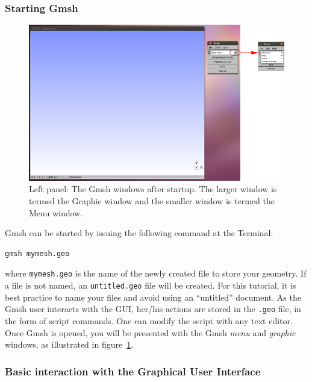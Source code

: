 \subsubsection{Starting Gmsh}
\begin{figure}[htbp]
 \centering
  \includegraphics[width=1.0\textwidth]{../figures/gmsh_startup_and_modules.png}
  \caption{Left panel: The Gmsh windows after startup. The larger window is termed the Graphic window
           and the smaller window is termed the Menu window.}
  \label{fig:gmsh_startup_and_modules}
\end{figure}
Gmsh can be started by issuing the following command at the Terminal:
\begin{lstlisting}
gmsh mymesh.geo
\end{lstlisting}
where \lstinline{mymesh.geo} is the name of the newly created file to store your geometry. If a file is
not named, an \lstinline{untitled.geo} file will be created. For this tutorial, it is best practice to
name your files and avoid using an ``untitled'' document. As the Gmsh user interacts with the GUI,
her/his actions are stored in the \lstinline{.geo} file, in the form of script commands. One can modify
the script with any text editor. Once Gmsh is opened, you will be presented with the Gmsh
\emph{menu} and \emph{graphic} windows, as illustrated in
figure~\ref{fig:gmsh_startup_and_modules}.

\subsubsection{Basic interaction with the Graphical User Interface}
\label{ssect:basic_interaction_gmsh_gui}

